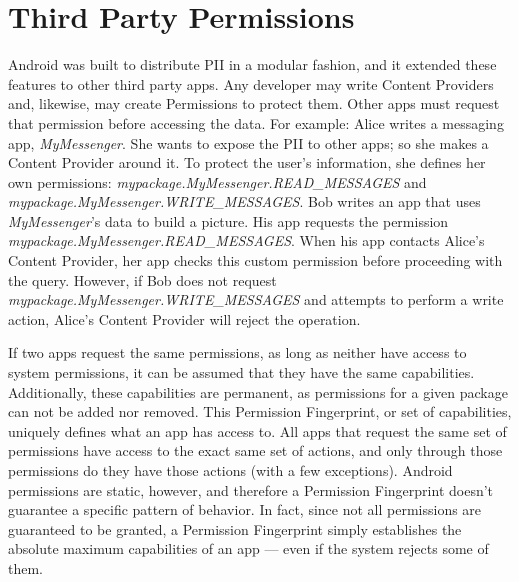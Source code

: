 \section{Third Party Permissions}
\begin{sloppypar}
Android was built to distribute PII in a modular fashion, and it extended these features to other third party apps. Any developer may write Content Providers and, likewise, may create Permissions to protect them. Other apps must request that permission before accessing the data. For example: Alice writes a messaging app, \textit{MyMessenger}. She wants to expose the PII to other apps; so she makes a Content Provider around it. To protect the user's information, she defines her own permissions: \textit{mypackage.MyMessenger.READ\_MESSAGES} and \textit{mypackage.MyMessenger.WRITE\_MESSAGES}. Bob writes an app that uses \textit{MyMessenger}'s data to build a picture. His app requests the permission \textit{mypackage.MyMessenger.READ\_MESSAGES}. When his app contacts Alice's Content Provider, her app checks this custom permission before proceeding with the query. However, if Bob does not request \textit{mypackage.MyMessenger.WRITE\_MESSAGES} and attempts to perform a write action, Alice's Content Provider will reject the operation.
\end{sloppypar}


If two apps request the same permissions, as long as neither have access to system permissions, it can be assumed that they have the same capabilities. Additionally, these capabilities are permanent, as permissions for a given package can not be added nor removed. This Permission Fingerprint, or set of capabilities, uniquely defines what an app has access to. All apps that request the same set of permissions have access to the exact same set of actions, and only through those permissions do they have those actions (with a few exceptions). Android permissions are static, however, and therefore a Permission Fingerprint doesn't guarantee a specific pattern of behavior. In fact, since not all permissions are guaranteed to be granted, a Permission Fingerprint simply establishes the absolute maximum capabilities of an app --- even if the system rejects some of them.
